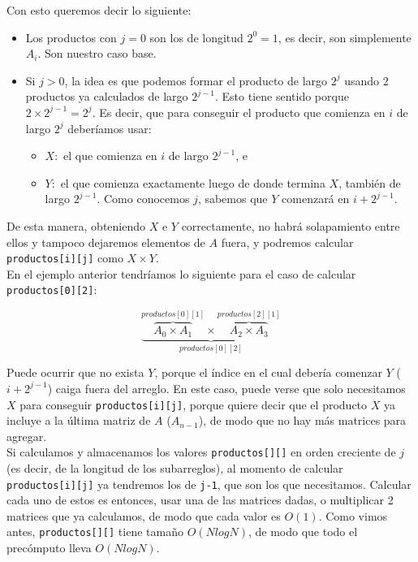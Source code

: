 Con esto queremos decir lo siguiente: 
\begin{itemize}
\item Los productos con $j=0$ son los de longitud $2^0=1$, es decir, 
son simplemente $A_i$. Son nuestro caso base. 
\item Si $j>0$, la idea es que podemos formar el producto de largo $2^j$ 
usando 2 productos ya calculados de largo $2^{j-1}$. Esto tiene sentido 
porque $2 \times 2^{j-1} = 2^j$. Es decir, que para conseguir el producto 
que comienza en $i$ de largo $2^j$ deberíamos usar: 
    \begin{itemize}
    \item $X:$ el que comienza en $i$ de largo $2^{j-1}$, e 
    \item $Y:$ el que comienza exactamente luego de donde termina $X$, también de largo 
    $2^{j-1}$. Como conocemos $j$, sabemos que $Y$ comenzará en $i+2^{j-1}$.
    \end{itemize}
\end{itemize}

De esta manera, obteniendo $X$ e $Y$ correctamente, no habrá solapamiento entre ellos 
y tampoco dejaremos elementos de $A$ fuera, y podremos calcular \texttt{productos[i][j]} 
como $X \times Y$. \\

En el ejemplo anterior tendríamos lo siguiente para el caso de calcular \texttt{productos[0][2]}:

$$\underset{productos[0][2]}{\underbrace{\overset{productos[0][1]}{\overbrace{A_0 \times A_1}} \times \overset{productos[2][1]}{\overbrace{A_2 \times A_3}}}}$$

Puede ocurrir que no exista $Y$, porque el índice en el cual debería comenzar $Y$ 
($i+2^{j-1}$) caiga fuera del arreglo. En este caso, puede verse que 
solo necesitamos $X$ para conseguir \texttt{productos[i][j]}, porque quiere decir que 
el producto $X$ ya incluye a la última matriz de $A$ ($A_{n-1}$), 
de modo que no hay más matrices para agregar. \\

Si calculamos y almacenamos los valores \texttt{productos[][]} en orden 
creciente de $j$ (es decir, de la longitud de los subarreglos), 
al momento de calcular \texttt{productos[i][j]} 
ya tendremos los de \texttt{j-1}, que son los que necesitamos. Calcular cada uno de estos es entonces, 
usar una de las matrices dadas, o multiplicar 2 matrices que ya calculamos, de modo que 
cada valor es $O(1)$. Como vimos antes, \texttt{productos[][]} tiene tamaño $O(N log N)$, 
de modo que todo el precómputo lleva $O(N log N)$. 


